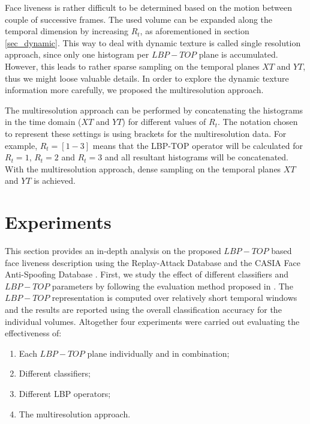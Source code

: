Face liveness is rather difficult to be determined based on the motion between couple of successive frames. The used volume can be expanded along the temporal dimension by increasing $R_t$, as aforementioned in section \ref{sec_dynamic}. This way to deal with dynamic texture is called single resolution approach, since only one histogram per $LBP-TOP$ plane is accumulated. However, this leads to rather sparse sampling on the temporal planes $XT$ and $YT$, thus we might loose valuable details. In order to explore the dynamic texture information more carefully, we proposed the multiresolution approach.

The multiresolution approach can be performed by concatenating the histograms in the time domain ($XT$ and $YT$) for different values of $R_t$. The notation chosen to represent these settings is using brackets for the multiresolution data. For example, $R_t=[1-3]$ means that the LBP-TOP operator will be calculated for $R_t=1$, $R_t=2$ and $R_t=3$ and all resultant histograms will be concatenated. With the multiresolution approach, dense sampling on the temporal planes $XT$ and $YT$ is achieved.


\section{Experiments}
\label{sec_experiments}

This section provides an in-depth analysis on the proposed $LBP-TOP$ based face liveness description using the Replay-Attack Database \cite{ChingovskaBIOSIG2012} and the CASIA Face Anti-Spoofing Database \cite{zhangface}. First, we study the effect of different classifiers and $LBP-TOP$ parameters by following the evaluation method proposed in \cite{TiagoLBP2012}. The $LBP-TOP$ representation is computed over relatively short temporal windows and the results are reported using the overall classification accuracy for the individual volumes. Altogether four experiments were carried out evaluating the effectiveness of:

\begin{enumerate}
        \item Each $LBP-TOP$ plane individually and in combination;
        \item Different classifiers;
        \item Different LBP operators;
        \item The multiresolution approach.
\end{enumerate}

